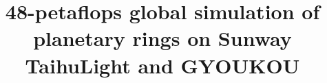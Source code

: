\documentclass[conference]{IEEEtran}
\begin{document}
%
\title{48-petaflops  global simulation of planetary rings on
Sunway TaihuLight  and GYOUKOU}






\end{document}
